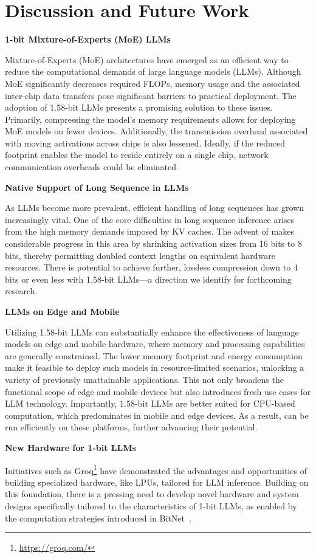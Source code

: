 \section{Discussion and Future Work}

\textbf{1-bit Mixture-of-Experts (MoE) LLMs}

Mixture-of-Experts (MoE) architectures have emerged as an efficient way to reduce the computational demands of large language models (LLMs). Although MoE significantly decreases required FLOPs, memory usage and the associated inter-chip data transfers pose significant barriers to practical deployment. The adoption of 1.58-bit LLMs presents a promising solution to these issues. Primarily, compressing the model's memory requirements allows for deploying MoE models on fewer devices. Additionally, the transmission overhead associated with moving activations across chips is also lessened. Ideally, if the reduced footprint enables the model to reside entirely on a single chip, network communication overheads could be eliminated.

\textbf{Native Support of Long Sequence in LLMs}

As LLMs become more prevalent, efficient handling of long sequences has grown increasingly vital. One of the core difficulties in long sequence inference arises from the high memory demands imposed by KV caches. The advent of  makes considerable progress in this area by shrinking activation sizes from 16 bits to 8 bits, thereby permitting doubled context lengths on equivalent hardware resources. There is potential to achieve further, lossless compression down to 4 bits or even less with 1.58-bit LLMs—a direction we identify for forthcoming research.

\textbf{LLMs on Edge and Mobile}

Utilizing 1.58-bit LLMs can substantially enhance the effectiveness of language models on edge and mobile hardware, where memory and processing capabilities are generally constrained. The lower memory footprint and energy consumption make it feasible to deploy such models in resource-limited scenarios, unlocking a variety of previously unattainable applications. This not only broadens the functional scope of edge and mobile devices but also introduces fresh use cases for LLM technology. Importantly, 1.58-bit LLMs are better suited for CPU-based computation, which predominates in mobile and edge devices. As a result,  can be run efficiently on these platforms, further advancing their potential.

\textbf{New Hardware for 1-bit LLMs}

Initiatives such as Groq\footnote{\url{https://groq.com/}} have demonstrated the advantages and opportunities of building specialized hardware, like LPUs, tailored for LLM inference. Building on this foundation, there is a pressing need to develop novel hardware and system designs specifically tailored to the characteristics of 1-bit LLMs, as enabled by the computation strategies introduced in BitNet~\cite{bitnet}.